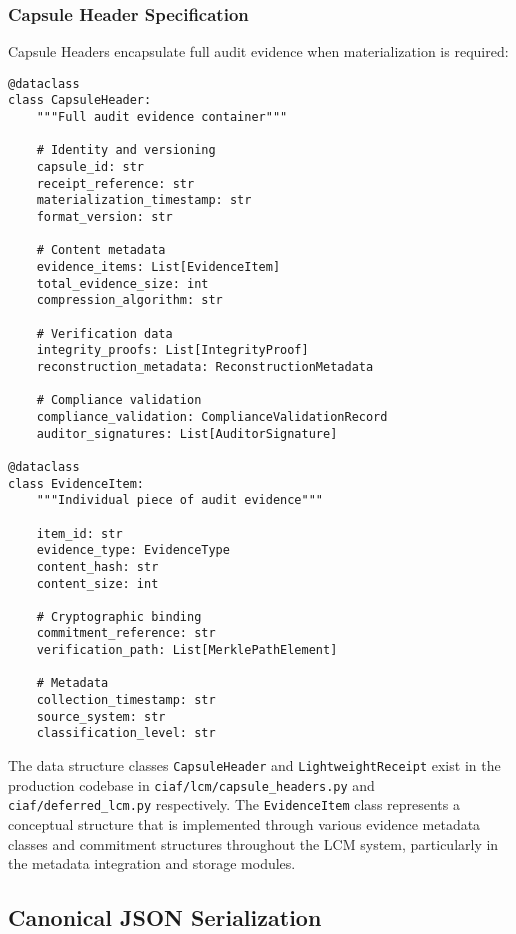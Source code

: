 \documentclass[12pt,a4paper]{article}
\begin{document}
\subsubsection{Capsule Header Specification}

Capsule Headers encapsulate full audit evidence when materialization is required:

\begin{lstlisting}[caption=Capsule Header Data Structure]
@dataclass  
class CapsuleHeader:
    """Full audit evidence container"""
    
    # Identity and versioning
    capsule_id: str
    receipt_reference: str
    materialization_timestamp: str
    format_version: str
    
    # Content metadata
    evidence_items: List[EvidenceItem]
    total_evidence_size: int
    compression_algorithm: str
    
    # Verification data
    integrity_proofs: List[IntegrityProof]
    reconstruction_metadata: ReconstructionMetadata
    
    # Compliance validation
    compliance_validation: ComplianceValidationRecord
    auditor_signatures: List[AuditorSignature]
    
@dataclass
class EvidenceItem:
    """Individual piece of audit evidence"""
    
    item_id: str
    evidence_type: EvidenceType
    content_hash: str
    content_size: int
    
    # Cryptographic binding
    commitment_reference: str
    verification_path: List[MerklePathElement]
    
    # Metadata
    collection_timestamp: str
    source_system: str
    classification_level: str
\end{lstlisting}

\begin{tcolorbox}[colframe=blue!70, colback=green!8, title={\textbf{Implementation Note}}]
The data structure classes \texttt{CapsuleHeader} and \texttt{LightweightReceipt} exist in the production codebase in \texttt{ciaf/lcm/capsule\_headers.py} and \texttt{ciaf/deferred\_lcm.py} respectively. The \texttt{EvidenceItem} class represents a conceptual structure that is implemented through various evidence metadata classes and commitment structures throughout the LCM system, particularly in the metadata integration and storage modules.
\end{tcolorbox}

\subsection{Canonical JSON Serialization}
\end{document}
